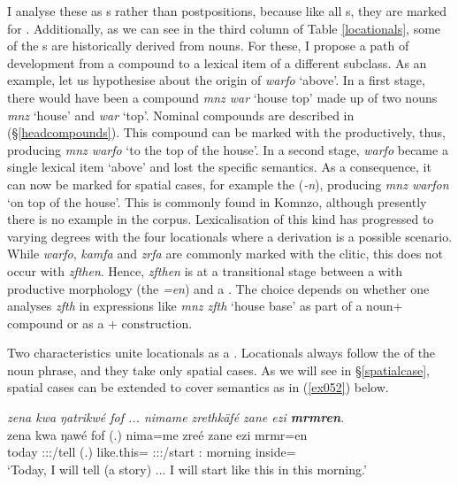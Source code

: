 I analyse these as  s rather than postpositions, because like all s, they are marked for . Additionally, as we can see in the third column of Table \ref{locationals}, some of the  s are historically derived from nouns. For these, I propose a path of development from a  compound to a lexical item of a different  subclass. As an example, let us hypothesise about the origin of \emph{warfo} `above'. In a first stage, there would have been a  compound \emph{mnz war} `house top' made up of two nouns \emph{mnz} `house' and \emph{war} `top'. Nominal compounds are described in (\S{}\ref{headcompounds}). This compound can be marked with the   productively, thus, producing \emph{mnz warfo} `to the top of the house'. In a second stage, \emph{warfo} became a single lexical item `above' and lost the specific  semantics. As a consequence, it can now be marked for spatial cases, for example the   (\emph{-n}), producing \emph{mnz warfon} `on top of the house'. This is commonly found in Komnzo, although presently there is no example in the corpus. Lexicalisation of this kind has progressed to varying degrees with the four locationals where a  derivation is a possible scenario. While \emph{warfo}, \emph{kamfa} and \emph{zrfa} are commonly marked with the   clitic, this does not occur with \emph{zfthen}. Hence, \emph{zfthen} is at a transitional stage between a  with productive morphology (the   \emph{=en}) and a . The choice depends on whether one analyses \emph{zfth} in expressions like \emph{mnz zfth} `house base' as part of a noun+ compound or as a + construction.%

Two characteristics unite locationals as a . Locationals always follow the  of the noun phrase, and they take only spatial cases. As we will see in \S{}\ref{spatialcase}, spatial cases can be extended to cover  semantics as in (\ref{ex052}) below.

\begin{exe}
	\ex \emph{zena kwa ŋatrikwé fof ... nimame zrethkäfé zane ezi \textbf{mrmren}.}\\
	\gll zena kwa ŋawé fof (.) nima=me zreé zane ezi mrmr=en\\
	today \Fut{} \Fsg:\Sbj:\Nonpast:\Ipfv/tell \Emph{} (.) {like.this}=\Ins{} \Fsg:\Sbj:\Irr:\Pfv/start \Dem:\Prox{} morning inside=\Loc{}\\
	\trans `Today, I will tell (a story) ... I will start like this in this morning.'\\
	\label{ex052}
\end{exe}

